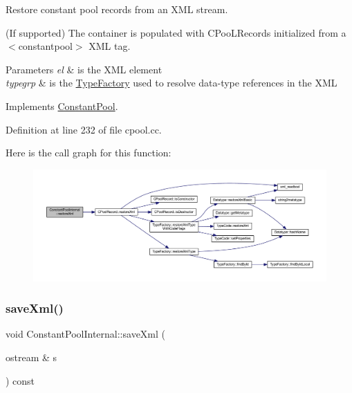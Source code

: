 Restore constant pool records from an X\+ML stream. 

(If supported) The container is populated with C\+Poo\+L\+Records initialized from a $<$constantpool$>$ X\+ML tag. 
\begin{DoxyParams}{Parameters}
{\em el} & is the X\+ML element \\
\hline
{\em typegrp} & is the \mbox{\hyperlink{class_type_factory}{Type\+Factory}} used to resolve data-\/type references in the X\+ML \\
\hline
\end{DoxyParams}


Implements \mbox{\hyperlink{class_constant_pool_a1ba24a59e40a1110cdd5d2a63f1a978c}{Constant\+Pool}}.



Definition at line 232 of file cpool.\+cc.

Here is the call graph for this function\+:
\nopagebreak
\begin{figure}[H]
\begin{center}
\leavevmode
\includegraphics[width=350pt]{class_constant_pool_internal_a28f4bf1f388ac9eb718f1790267b662d_cgraph}
\end{center}
\end{figure}
\mbox{\label{class_constant_pool_internal_a5386f07fda2fff612dca7acea0ea68ad}} 
\subsubsection{\texorpdfstring{saveXml()}{saveXml()}}
{\footnotesize\ttfamily void Constant\+Pool\+Internal\+::save\+Xml (\begin{DoxyParamCaption}\item[{ostream \&}]{s }\end{DoxyParamCaption}) const\hspace{0.3cm}{\ttfamily [virtual]}}



